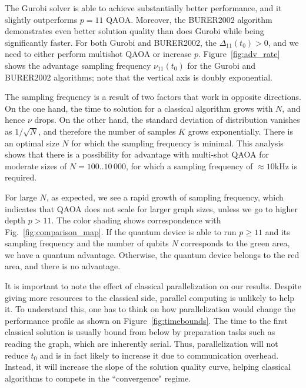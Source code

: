 \documentclass[prb,reprint,nofootinbib,longbibliography,superscriptaddress]{revtex4-1}
\begin{document}
The Gurobi solver is able to achieve substantially better performance, and it slightly outperforms $p=11$ QAOA. Moreover, the BURER2002 algorithm demonstrates even better solution quality than does  Gurobi while being significantly faster. For both Gurobi and BURER2002, the $\Delta_{11}(t_0) > 0$, and we need to either perform multishot QAOA or increase $p$. Figure~\ref{fig:adv_rate} shows the advantage sampling frequency $\nu_{11}(t_0)$ for the Gurobi and BURER2002 algorithms; note that the vertical axis is doubly exponential.

The sampling frequency is a result of two factors that work in opposite directions. On the one hand, the time to solution for a classical algorithm grows with $N$, and hence $\nu$ drops. On the other hand, the  standard deviation of distribution vanishes as $1/\sqrt{N}$, and therefore the number of samples $K$ grows exponentially. There is an optimal size $N$ for which the sampling frequency is minimal.
This analysis shows that there is a possibility for advantage with multi-shot QAOA for moderate sizes of $N=100..10\,000$, for which a sampling frequency of $\approx10$kHz is required.

For large $N$, as expected, we see a rapid growth of sampling frequency, which indicates that QAOA does not scale for larger graph sizes, unless we go to higher depth $p>11$. The color shading shows correspondence with Fig.~\ref{fig:comparison_map}. If the quantum device is able to run $p \geq 11$ and its sampling frequency and the number of qubits $N$ corresponds to the green area, we have a quantum advantage. Otherwise, the quantum device belongs to the red area, and there is no advantage.

It is important to note the effect of classical parallelization on our results. Despite giving more resources to the classical side, parallel computing is unlikely to help it. To understand this, one has to think on how parallelization would change the performance profile as shown on Figure~\ref{fig:timebounds}. The time to the first classical solution is usually bound from below by preparation tasks such as reading the graph, which are inherently serial. Thus, parallelization will not reduce $t_0$ and is in fact likely to increase it due to communication overhead. Instead, it will increase the slope of the solution quality curve, helping classical algorithms to compete in the ``convergence" regime. 
\end{document}
